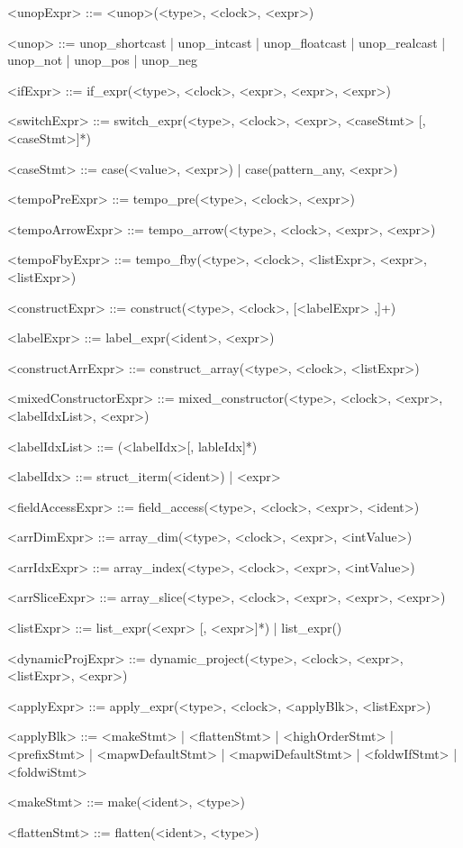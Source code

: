 \documentclass{article}
\begin{document}
\begin{grammar}
<unopExpr> ::= <unop>(<type>, <clock>, <expr>)

<unop> ::= unop_shortcast | unop_intcast | unop_floatcast |
           unop_realcast | unop_not | unop_pos | unop_neg

<ifExpr> ::= if_expr(<type>, <clock>, <expr>, <expr>, <expr>)

<switchExpr> ::= switch_expr(<type>, <clock>, <expr>, <caseStmt> [,<caseStmt>]*)

<caseStmt> ::= case(<value>, <expr>) | case(pattern_any, <expr>)

<tempoPreExpr> ::= tempo_pre(<type>, <clock>, <expr>)

<tempoArrowExpr> ::= tempo_arrow(<type>, <clock>, <expr>, <expr>)

<tempoFbyExpr> ::= tempo_fby(<type>, <clock>, <listExpr>, <expr>, <listExpr>)

<constructExpr> ::= construct(<type>, <clock>, [<labelExpr> ,]+)

<labelExpr> ::= label_expr(<ident>, <expr>)

<constructArrExpr> ::= construct_array(<type>, <clock>, <listExpr>)

<mixedConstructorExpr> ::= mixed_constructor(<type>, <clock>, <expr>, <labelIdxList>, <expr>)

<labelIdxList> ::= (<labelIdx>[, lableIdx]*)

<labelIdx> ::= struct_iterm(<ident>) | <expr>

<fieldAccessExpr> ::= field_access(<type>, <clock>, <expr>, <ident>)

<arrDimExpr> ::= array_dim(<type>, <clock>, <expr>, <intValue>)

<arrIdxExpr> ::= array_index(<type>, <clock>, <expr>, <intValue>)

<arrSliceExpr> ::= array_slice(<type>, <clock>, <expr>, <expr>, <expr>)

<listExpr> ::= list_expr(<expr> [, <expr>]*) | list_expr()

<dynamicProjExpr> ::= dynamic_project(<type>, <clock>, <expr>, <listExpr>, <expr>)

<applyExpr> ::= apply_expr(<type>, <clock>, <applyBlk>, <listExpr>)

<applyBlk> ::= <makeStmt> | <flattenStmt> | <highOrderStmt> | <prefixStmt> |
               <mapwDefaultStmt> | <mapwiDefaultStmt> |
               <foldwIfStmt> | <foldwiStmt>

<makeStmt> ::= make(<ident>, <type>)

<flattenStmt> ::= flatten(<ident>, <type>)


\end{grammar}
\end{document}
